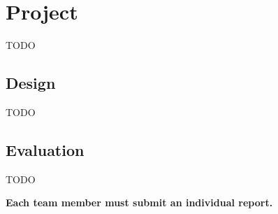 \documentclass[final]{ieee}
\begin{document}
\section{Project}

TODO

\subsection{Design}
TODO
\subsection{Evaluation}
TODO


{\bf Each team member must submit an individual report.}







\end{document}
